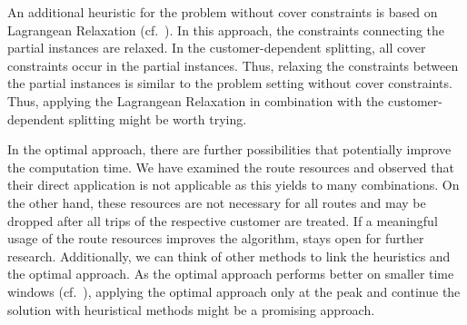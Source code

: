 An additional heuristic for the problem without cover constraints is based on Lagrangean Relaxation (cf.~\cite[Cap.~9]{Knoll}). In this approach, the constraints connecting the partial instances are relaxed. In the customer-dependent splitting, all cover constraints occur in the partial instances. Thus, relaxing the constraints between the partial instances is similar to the problem setting without cover constraints. Thus, applying the Lagrangean Relaxation in combination with the customer-dependent splitting might be worth trying.

In the optimal approach, there are further possibilities that potentially improve the computation time. We have examined the route resources and observed that their direct application is not applicable as this yields to many combinations. On the other hand, these resources are not necessary for all routes and may be dropped after all trips of the respective customer are treated. If a meaningful usage of the route resources improves the algorithm, stays open for further research. Additionally, we can think of other methods to link the heuristics and the optimal approach. As the optimal approach performs better on smaller time windows (cf.~\cite[Sec.~10.2]{Kaiser}), applying the optimal approach only at the peak and continue the solution with heuristical methods might be a promising approach.